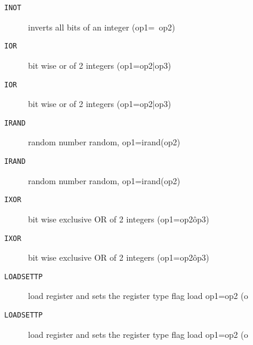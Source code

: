 
\begin{description}
\item[\texttt{INOT       }]  inverts all bits of an integer (op1=~op2)\\
\end{description}

\begin{description}
\item[\texttt{IOR        }]  bit wise or of 2 integers (op1=op2|op3)\\
\end{description}

\begin{description}
\item[\texttt{IOR        }]  bit wise or of 2 integers (op1=op2|op3)\\
\end{description}

\begin{description}
\item[\texttt{IRAND      }]  random number random, op1=irand(op2)\\
\end{description}

\begin{description}
\item[\texttt{IRAND      }]  random number random, op1=irand(op2)\\
\end{description}

\begin{description}
\item[\texttt{IXOR       }]  bit wise exclusive OR of 2 integers (op1=op2\^op3)\\
\end{description}

\begin{description}
\item[\texttt{IXOR       }]  bit wise exclusive OR of 2 integers (op1=op2\^op3)\\
\end{description}

\begin{description}
\item[\texttt{LOADSETTP  }]  load register and sets the register type flag load op1=op2 (o\\
\end{description}

\begin{description}
\item[\texttt{LOADSETTP  }]  load register and sets the register type flag load op1=op2 (o\\
\end{description}
